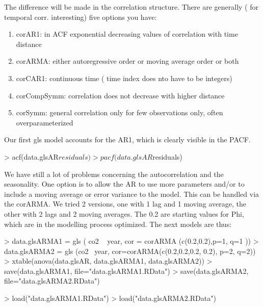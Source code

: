 \documentclass[11pt, a4paper]{article} %
\begin{document}
The difference will be made in the correlation structure. There are generally ( for temporal corr. interesting) five options you have:
\begin{enumerate}
\item corAR1: in ACF exponential decreasing values of correlation with time distance\\
\item corARMA: either autoregressive order or moving average order or both\\
\item corCAR1: continuous time ( time index does nto have to be integers)\\
\item corCompSymm: correlation does not decrease with higher distance\\
\item corSymm: general correlation only for few observations only, often overparameterized\\
\end{enumerate}
Our first gls model accounts for the AR1, which is clearly visible in the PACF.
\begin{Schunk}
\begin{Sinput}
> acf(data.glsAR$residuals)
> pacf(data.glsAR$residuals)
\end{Sinput}
\end{Schunk}
We have still a lot of problems concerning the autocorrelation and the seasonality. One option is to allow the AR to use more parameters and/or to include a moving average or error variance to the model. This can be handled via the corARMA. We tried 2 versions, one with 1 lag and 1 moving average, the other with 2 lags and 2 moving averages.
The 0.2 are starting values for Phi, which are in the modelling process optimized.
The next models are thus:
\begin{Schunk}
\begin{Sinput}
> data.glsARMA1 = gls ( co2 ~ year, cor = corARMA (c(0.2,0.2),p=1, q=1 ))
> data.glsARMA2 = gls (co2 ~year, cor=corARMA(c(0.2,0.2,0.2, 0.2), p=2, q=2))
> xtable(anova(data.glsAR, data.glsARMA1, data.glsARMA2))
> save(data.glsARMA1, file="data.glsARMA1.RData")
> save(data.glsARMA2, file="data.glsARMA2.RData")
\end{Sinput}
\end{Schunk}

\begin{Schunk}
\begin{Sinput}
> load("data.glsARMA1.RData")
> load("data.glsARMA2.RData")
\end{Sinput}
\end{Schunk}
\end{document}
